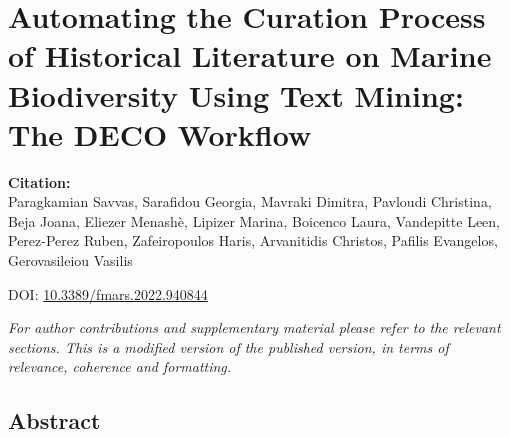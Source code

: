 % 
% 


\chapter{Automating the Curation Process of Historical Literature on Marine Biodiversity Using Text Mining: The DECO Workflow}
\label{cha:deco}


\textbf{Citation:} \\ 
Paragkamian Savvas, Sarafidou Georgia, Mavraki Dimitra, Pavloudi Christina,
Beja Joana, Eliezer Menashè, Lipizer Marina, Boicenco Laura, Vandepitte Leen,
Perez-Perez Ruben, Zafeiropoulos Haris, Arvanitidis Christos, Pafilis Evangelos, Gerovasileiou Vasilis

DOI: \href{https://www.frontiersin.org/articles/10.3389/fmars.2022.940844}{10.3389/fmars.2022.940844}

\textit{For author contributions and supplementary material please refer 
    to the relevant sections. This is a modified version of the published 
    version, in terms of relevance, coherence and formatting.}


\section{Abstract}

